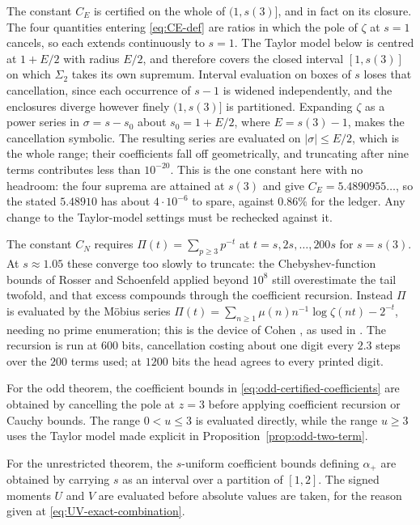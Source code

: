 \documentclass[11pt]{amsart}
\theoremstyle{plain}
\theoremstyle{definition}
\newcommand{\abs}[1]{\lvert #1\rvert}
\begin{document}
The constant $C_E$ is certified on the whole of $(1,s(3)]$, and in fact on its
closure. The four quantities entering \eqref{eq:CE-def} are ratios in which
the pole of $\zeta$ at $s=1$ cancels, so each extends continuously to $s=1$.
The Taylor model below is centred at $1+E/2$ with radius $E/2$, and therefore
covers the closed interval $[1,s(3)]$ on which $\Sigma_2$ takes its own
supremum. Interval evaluation on boxes of $s$ loses that cancellation, since
each occurrence of $s-1$ is widened independently, and the enclosures diverge
however finely $(1,s(3)]$ is partitioned. Expanding $\zeta$
as a power series in $\sigma=s-s_0$ about $s_0=1+E/2$, where $E=s(3)-1$, makes
the cancellation symbolic. The resulting series are evaluated on
$\abs{\sigma}\leq E/2$, which is the whole range; their coefficients fall off
geometrically, and truncating after nine terms contributes less than
$10^{-20}$. This is the one constant here with no headroom: the four suprema
are attained at $s(3)$ and give $C_E=5.4890955\ldots$, so the stated
$5.48910$ has about $4\cdot10^{-6}$ to spare, against $0.86\%$ for the ledger.
Any change to the Taylor-model settings must be rechecked against it.

The constant $C_N$ requires $\Pi(t)=\sum_{p\geq3}p^{-t}$ at
$t=s,2s,\dots,200s$ for $s=s(3)$. At $s\approx1.05$ these converge too slowly
to truncate: the Chebyshev-function bounds of Rosser and Schoenfeld
\cite{RS} applied beyond $10^8$ still overestimate the tail twofold,
and that excess compounds through the coefficient recursion. Instead $\Pi$ is
evaluated by the M\"obius series
$\Pi(t)=\sum_{n\geq1}\mu(n)n^{-1}\log\zeta(nt)-2^{-t}$, needing no prime
enumeration; this is the device of Cohen \cite{Cohen}, as used in
\cite[(3.6)]{Lichtman19}. The recursion is run at $600$ bits, cancellation
costing about one digit every $2.3$ steps over the $200$ terms used; at $1200$
bits the head agrees to every printed digit.

For the odd theorem, the coefficient bounds in
\eqref{eq:odd-certified-coefficients} are obtained by cancelling the pole at
$z=3$ before applying coefficient recursion or Cauchy bounds. The range
$0<u\leq3$ is evaluated directly, while the range $u\geq3$ uses the Taylor
model made explicit in Proposition~\ref{prop:odd-two-term}.

For the unrestricted theorem, the $s$-uniform coefficient bounds defining
$\alpha_+$ are obtained by carrying $s$ as an interval over a partition of
$[1,2]$. The signed moments $U$ and $V$ are evaluated before absolute values
are taken, for the reason given at \eqref{eq:UV-exact-combination}.
\end{document}

